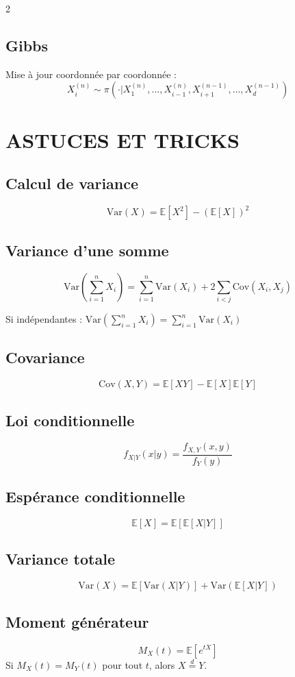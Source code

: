 \documentclass[10pt,a4paper]{article}
\begin{document}
\begin{multicols}{2}
\subsection*{Gibbs}
Mise à jour coordonnée par coordonnée :
\[
X_i^{(n)} \sim \pi(\cdot | X_1^{(n)}, \ldots, X_{i-1}^{(n)}, X_{i+1}^{(n-1)}, \ldots, X_d^{(n-1)})
\]

\section*{ASTUCES ET TRICKS}

\subsection*{Calcul de variance}
\[
\text{Var}(X) = \mathbb{E}[X^2] - (\mathbb{E}[X])^2
\]

\subsection*{Variance d'une somme}
\[
\text{Var}\left(\sum_{i=1}^n X_i\right) = \sum_{i=1}^n \text{Var}(X_i) + 2 \sum_{i<j} \text{Cov}(X_i, X_j)
\]

Si indépendantes : $\text{Var}\left(\sum_{i=1}^n X_i\right) = \sum_{i=1}^n \text{Var}(X_i)$

\subsection*{Covariance}
\[
\text{Cov}(X, Y) = \mathbb{E}[XY] - \mathbb{E}[X]\mathbb{E}[Y]
\]

\subsection*{Loi conditionnelle}
\[
f_{X|Y}(x|y) = \frac{f_{X,Y}(x,y)}{f_Y(y)}
\]

\subsection*{Espérance conditionnelle}
\[
\mathbb{E}[X] = \mathbb{E}[\mathbb{E}[X|Y]]
\]

\subsection*{Variance totale}
\[
\text{Var}(X) = \mathbb{E}[\text{Var}(X|Y)] + \text{Var}(\mathbb{E}[X|Y])
\]

\subsection*{Moment générateur}
\[
M_X(t) = \mathbb{E}[e^{tX}]
\]
Si $M_X(t) = M_Y(t)$ pour tout $t$, alors $X \stackrel{d}{=} Y$.


\end{multicols}
\end{document}
